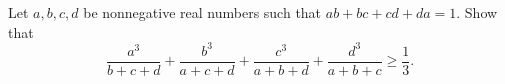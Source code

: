Let $a,b,c,d$ be nonnegative real numbers such that $ab+bc+cd+da=1$. Show that
\[ \frac{a^{3}}{b+c+d} + \frac{b^{3}}{a+c+d} + \frac{c^{3}}{a+b+d} + \frac{d^{3}}{a+b+c} \geq \frac{1}{3}. \]

